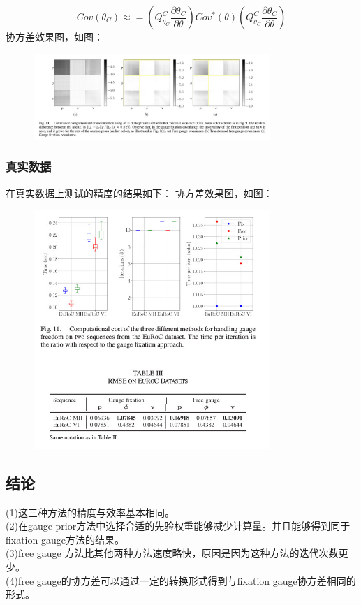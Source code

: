 \documentclass[UTF8]{ctexart}
\begin{document}
\begin{equation}
Cov(\theta_C) \approx =(Q_{\theta_C}^C\frac{\partial \theta_C}{\partial\theta})Cov^*(\theta)(Q_{\theta_C}^C\frac{\partial \theta_C}{\partial\theta})
\end{equation}
\indent 协方差效果图，如图：
\begin{figure}[H]
\centering
\includegraphics[width=0.8\textwidth]{2.4.jpg}    
\label{img0}
\end{figure}
\subsubsection{真实数据}
\indent 在真实数据上测试的精度的结果如下：
\indent 协方差效果图，如图：
\begin{figure}[H]
\centering
\includegraphics[width=0.8\textwidth]{2.5.jpg}    
\label{img0}
\end{figure}

\subsection{结论}
\indent (1)这三种方法的精度与效率基本相同。\\
\indent (2)在gauge prior方法中选择合适的先验权重能够减少计算量。并且能够得到同于fixation gauge方法的结果。\\
\indent (3)free gauge 方法比其他两种方法速度略快，原因是因为这种方法的迭代次数更少。\\
\indent (4)free gauge的协方差可以通过一定的转换形式得到与fixation gauge协方差相同的形式。\\
\end{document}
